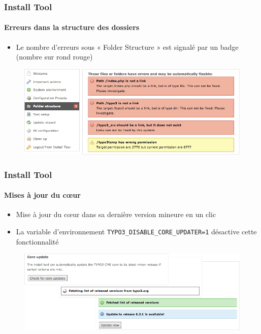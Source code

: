 
\begin{frame}[fragile]
	\frametitle{Install Tool}
	\framesubtitle{Erreurs dans la structure des dossiers}

	\begin{itemize}
		\item Le nombre d'erreurs sous « Folder Structure » est signalé par un badge (nombre sur rond rouge)
	\end{itemize}

	\begin{figure}
		\includegraphics[width=0.95\linewidth]{Images/InstallTool/ErrorsInFolderStructure.png}
	\end{figure}

\end{frame}


\begin{frame}[fragile]
	\frametitle{Install Tool}
	\framesubtitle{Mises à jour du cœur}

	\begin{itemize}
		\item Mise à jour du cœur dans sa dernière version mineure en un clic 
		\item La variable d'environnement \texttt{TYPO3\_DISABLE\_CORE\_UPDATER=1} désactive cette fonctionnalité
	\end{itemize}

	\begin{figure}
		\includegraphics[width=0.95\linewidth]{Images/InstallTool/CoreUpdate.png}
	\end{figure}

\end{frame}

